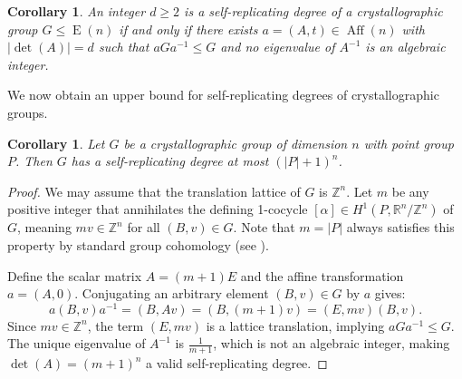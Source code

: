 \documentclass[draft]{adm-paper}
\newtheorem{corollary}[theorem]{Corollary}
\theoremstyle{definition}
\begin{document}
\begin{corollary}
An integer $d \ge 2$ is a self-replicating degree of a crystallographic group $G\le \operatorname{E}(n)$ if and only if
there exists $a=(A,t)\in\operatorname{Aff}(n)$ with $|\det(A)| = d$ such that $aGa^{-1} \le G$ and
no eigenvalue of $A^{-1}$ is an algebraic integer.
\end{corollary}


We now obtain an upper bound for self-replicating degrees of crystallographic groups.

\begin{corollary}\label{cor:upper_bound}
Let $G$ be a crystallographic group of dimension $n$ with point group $P$. Then $G$ has a self-replicating degree at most $(|P|+1)^n$.
\end{corollary}
\begin{proof}
We may assume that the translation lattice of $G$ is $\mathbb{Z}^n$. Let $m$ be any positive integer that annihilates
the defining 1-cocycle $[\alpha] \in H^1(P, \mathbb{R}^n/\mathbb{Z}^n)$ of $G$, meaning $mv \in \mathbb{Z}^n$ for all
$(B,v) \in G$. Note that $m = |P|$ always satisfies this property by standard group cohomology
(see \cite[Ch.~III, Cor.~10.2]{Brown:Cohomology}).

Define the scalar matrix $A = (m+1)E$ and the affine transformation $a = (A, 0)$. Conjugating an arbitrary element
$(B, v) \in G$ by $a$ gives:
$$ a (B, v) a^{-1} = (B, Av) = (B, (m+1)v) = (E, mv)(B, v).$$
Since $mv \in \mathbb{Z}^n$, the term $(E, mv)$ is a lattice translation, implying $aGa^{-1} \le G$. The unique
eigenvalue of $A^{-1}$ is $\frac{1}{m+1}$, which is not an algebraic integer, making $\det(A) = (m+1)^n$ a valid
self-replicating degree.
\end{proof}

\end{document}
